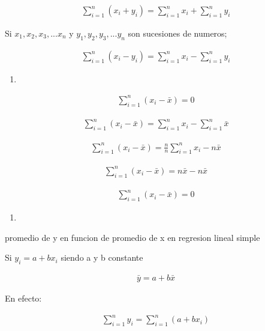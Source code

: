 \documentclass[twocolumn]{article}
\begin{document}
\begin{align}
\sum_{i=1}^n (x_i + y_i) =  \sum_{i=1}^n x_i + \sum_{i=1}^n y_i
\end{align}

Si \(x_1, x_2, x_3,...x_n\) y \(y_1, y_2, y_3,...y_n\) son sucesiones de
numeros;

\begin{align}
\sum_{i=1}^n (x_i - y_i) =  \sum_{i=1}^n x_i - \sum_{i=1}^n y_i
\end{align}

\begin{enumerate}
\def\labelenumi{\arabic{enumi}.}
\setcounter{enumi}{4}
\item
\end{enumerate}

\begin{align}
\sum_{i=1}^n (x_i - \bar{x}) = 0
\end{align}

\begin{align}
\sum_{i=1}^n (x_i - \bar{x}) =  \sum_{i=1}^n x_i - \sum_{i=1}^n \bar{x}
\end{align}

\begin{align}
 \sum_{i=1}^n (x_i - \bar{x}) = \frac{n}{n} \sum_{i=1}^n x_i - n \bar{x}
\end{align}

\begin{align}
 \sum_{i=1}^n (x_i - \bar{x}) = n \bar{x} - n \bar{x}
\end{align}

\begin{align}
 \sum_{i=1}^n (x_i - \bar{x}) = 0
\end{align}

\begin{enumerate}
\def\labelenumi{\arabic{enumi}.}
\setcounter{enumi}{5}
\item
\end{enumerate}

promedio de y en funcion de promedio de x en regresion lineal simple

Si \(y_i = a + b x_i\) siendo a y b constante

\begin{align}
\bar{y} = a + b \bar{x}
\end{align}

En efecto:

\begin{align}
\sum_{i= 1}^n y_i = \sum_{i=1}^n (a + b x_i)
\end{align}
\end{document}
